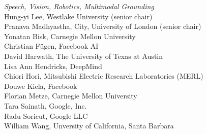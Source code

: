 \emph{Speech, Vision, Robotics, Multimodal Grounding} \\
\hspace*{0.2in} Hung-yi Lee, Westlake University (senior chair)\\
\hspace*{0.2in} Pranava Madhyastha, City, University of London (senior chair)\\
\hspace*{0.2in} Yonatan Bisk, Carnegie Mellon University\\
\hspace*{0.2in} Christian Fügen, Facebook AI\\
\hspace*{0.2in} David Harwath, The University of Texas at Austin\\
\hspace*{0.2in} Lisa Ann Hendricks, DeepMind\\
\hspace*{0.2in} Chiori Hori, Mitsubishi Electric Research Laboratories (MERL)\\
\hspace*{0.2in} Douwe Kiela, Facebook\\
\hspace*{0.2in} Florian Metze, Carnegie Mellon University\\
\hspace*{0.2in} Tara Sainath, Google, Inc.\\
\hspace*{0.2in} Radu Soricut, Google LLC\\
\hspace*{0.2in} William Wang, Unversity of California, Santa Barbara\\

